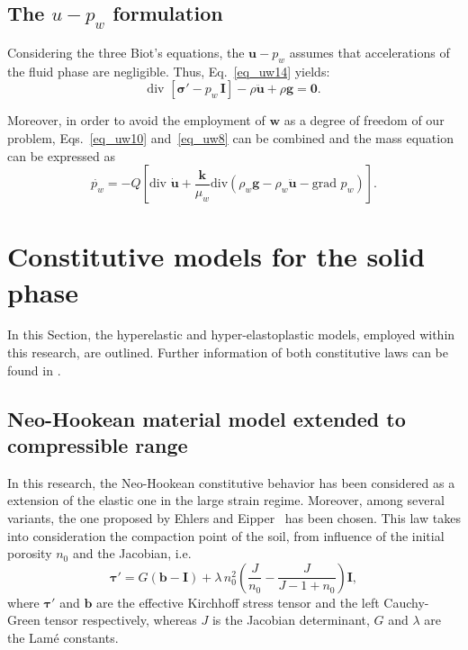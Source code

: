 \documentclass[twocolumn]{svjour3}          %
\begin{document}
\subsection{The $u-p_w$ formulation}
\label{subsec:23}
Considering the three Biot's equations, the $\boldsymbol{u}-p_w$ assumes that accelerations of the fluid phase are negligible. Thus, Eq.~\eqref{eq_uw14} yields:
\begin{equation}\label{eq_uw15}
\mbox{div }\left[ \boldsymbol{ \sigma'} - p_{w} \, \textbf{I} \right]-\rho\boldsymbol{\ddot{u}}+\rho\boldsymbol{g}=\boldsymbol{0}.
\end{equation}

Moreover, in order to avoid the employment of $\boldsymbol{w}$ as a degree of freedom of our problem, Eqs.~\eqref{eq_uw10} and~\eqref{eq_uw8} can be combined and the mass equation can be expressed as
\begin{equation}\label{eq_uw11}
\dot{p_w} = -Q\left [ \mbox{div } \dot{\boldsymbol{u}} + \frac{\boldsymbol{k}}{\mu_w} \mbox{div}\left(   \rho_w \boldsymbol{g} - \rho_w \ddot{\boldsymbol{u}} - \mbox{grad }p_w\right)\right ].
\end{equation}


\section{Constitutive models for the solid phase} \label{sec:3}
In this Section, the hyperelastic and hyper-elastoplastic models, employed within this research, are outlined. Further information of both constitutive laws can be found in \cite{Navas:17b,Navas:17c}.
\subsection{Neo-Hookean material model extended to compressible range} \label{subsec:31}

In this research, the Neo-Hookean constitutive behavior has been considered as a extension of the elastic one in the large strain regime. Moreover, among several variants, the one proposed by Ehlers and Eipper~\cite{Ehlers:99} has been chosen. This law takes into consideration the compaction point of the soil, from influence of  the initial porosity  $n_0$ and the Jacobian, i.e.
\begin{equation}\label{eq_nh2}
\boldsymbol{\tau}'=G(\boldsymbol{b}-\textbf{I})+\lambda \, n_0^2\left(  \frac{J}{n_0}-\frac{J}{J-1+n_0} \right)\textbf{I},
\end{equation}
where $\boldsymbol{\tau}'$ and  $\boldsymbol{b}$ are the effective Kirchhoff stress tensor and the left Cauchy-Green tensor respectively, whereas $J$ is the Jacobian determinant, $G$ and $\lambda$ are the Lam\'e constants.  
\end{document}
